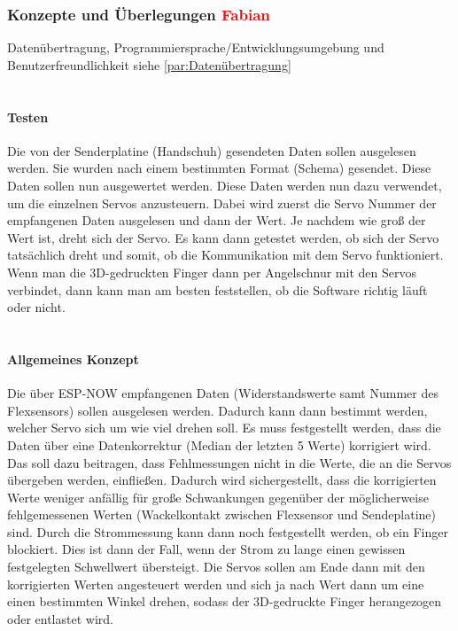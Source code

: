 \documentclass[titlepage,12pt,twoside]{article}
\begin{document}
\subsubsection{Konzepte und Überlegungen \textcolor{red}{Fabian}}
Datenübertragung, Programmiersprache/Entwicklungsumgebung und Benutzerfreundlichkeit siehe \autoref{par:Datenübertragung} \\
\\
\paragraph{Testen}
\hfill \break
\hfill \break
Die von der Senderplatine (Handschuh) gesendeten Daten sollen ausgelesen werden. Sie wurden nach einem bestimmten Format 
(Schema) gesendet. Diese Daten sollen nun ausgewertet werden. Diese Daten werden nun dazu verwendet, um die einzelnen Servos 
anzusteuern. Dabei wird zuerst die Servo Nummer der empfangenen Daten ausgelesen und dann der Wert. Je nachdem wie groß der
Wert ist, dreht sich der Servo. Es kann dann getestet werden, ob sich der Servo tatsächlich dreht und somit, ob die 
Kommunikation mit dem Servo funktioniert. Wenn man die 3D-gedruckten Finger dann per Angelschnur mit den Servos verbindet, 
dann kann man am besten feststellen, ob die Software richtig läuft oder nicht. \\
\\
\paragraph{Allgemeines Konzept}
\hfill \break
\hfill \break
Die über ESP-NOW empfangenen Daten (Widerstandswerte samt Nummer des Flexsensors) sollen ausgelesen werden. Dadurch kann dann 
bestimmt werden, welcher Servo sich um wie viel drehen soll. Es muss festgestellt werden, dass die Daten über eine 
Datenkorrektur (Median der letzten 5 Werte) korrigiert wird. Das soll dazu beitragen, dass Fehlmessungen nicht in die Werte, 
die an die Servos übergeben werden, einfließen. Dadurch wird sichergestellt, dass die korrigierten Werte weniger anfällig für 
große Schwankungen gegenüber der möglicherweise fehlgemessenen Werten (Wackelkontakt zwischen Flexsensor und Sendeplatine) sind. 
Durch die Strommessung kann dann noch festgestellt werden, ob ein Finger blockiert. Dies ist dann der Fall, wenn der Strom zu 
lange einen gewissen festgelegten Schwellwert übersteigt. Die Servos sollen am Ende dann mit den korrigierten Werten angesteuert 
werden und sich ja nach Wert dann um eine einen bestimmten Winkel drehen, sodass der 3D-gedruckte Finger herangezogen oder
entlastet wird.
\\
\end{document}
